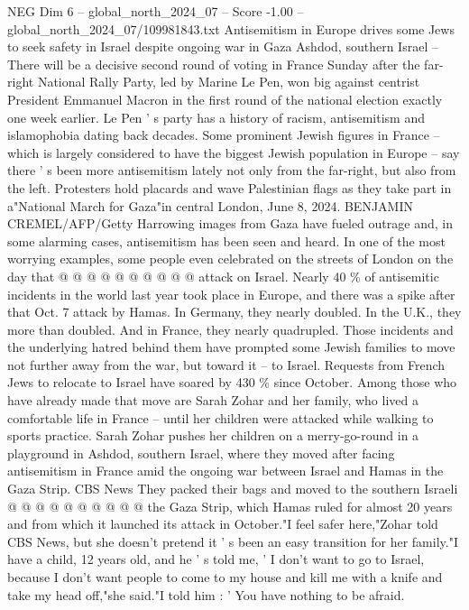 \begin{textsample}{NEG Dim 6 – global\_north\_2024\_07 – Score -1.00 – global\_north\_2024\_07/109981843.txt}  \label{ex:f6_neg_138}
Antisemitism in Europe drives some Jews to seek safety in Israel despite ongoing war in Gaza Ashdod, southern Israel -- There will be a decisive second round of voting in France Sunday after the far-right National Rally Party, led by Marine Le Pen, won big against centrist President Emmanuel Macron in the first round of the national election exactly one week earlier.
Le Pen ' s party has a history of racism, antisemitism and islamophobia dating back decades.
Some prominent Jewish figures in France -- which is largely considered to have the biggest Jewish population in Europe -- say there ' s been more antisemitism lately not only from the far-right, but also from the left.
Protesters hold placards and wave Palestinian flags as they take part in a"National March for Gaza"in central London, June 8, 2024.
BENJAMIN CREMEL/AFP/Getty Harrowing images from Gaza have fueled outrage and, in some alarming cases, antisemitism has been seen and heard.
In one of the most worrying examples, some people even celebrated on the streets of London on the day that @ @ @ @ @ @ @ @ @ @ attack on Israel.
Nearly 40 \% of antisemitic incidents in the world last year took place in Europe, and there was a spike after that Oct. 7 attack by Hamas.
In Germany, they nearly doubled.
In the U.K., they more than doubled.
And in France, they nearly quadrupled.
Those incidents and the underlying hatred behind them have prompted some Jewish families to move not further away from the war, but toward it -- to Israel.
Requests from French Jews to relocate to Israel have soared by 430 \% since October.
Among those who have already made that move are Sarah Zohar and her family, who lived a comfortable life in France -- until her children were attacked while walking to sports practice.
Sarah Zohar pushes her children on a merry-go-round in a playground in Ashdod, southern Israel, where they moved after facing antisemitism in France amid the ongoing war between Israel and Hamas in the Gaza Strip.
CBS News They packed their bags and moved to the southern Israeli @ @ @ @ @ @ @ @ @ @ the Gaza Strip, which Hamas ruled for almost 20 years and from which it launched its attack in October."I feel safer here,"Zohar told CBS News, but she doesn't pretend it ' s been an easy transition for her family."I have a child, 12 years old, and he ' s told me, ' I don't want to go to Israel, because I don't want people to come to my house and kill me with a knife and take my head off,"she said."I told him : ' You have nothing to be afraid.

\end{textsample}
